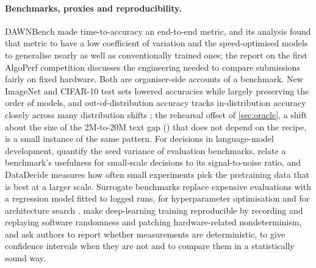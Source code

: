 \paragraph{Benchmarks, proxies and reproducibility.} DAWNBench \citep{coleman2017dawnbench} made time-to-accuracy an
end-to-end metric, and its analysis \citep{coleman2019dawnbench} found that metric to have a low coefficient of
variation and the speed-optimised models to generalise nearly as well as conventionally trained ones; the report on
the first AlgoPerf competition \citep{kasimbeg2025algoperf} discusses the engineering needed to compare submissions
fairly on fixed hardware. Both are organiser-side accounts of a benchmark. New ImageNet and CIFAR-10 test sets
\citep{recht2019imagenet} lowered accuracies while largely preserving the order of models, and out-of-distribution
accuracy tracks in-distribution accuracy closely across many distribution shifts \citep{miller2021accuracy}; the
rehearsal offset of \cref{sec:oracle}, a shift about the size of the 2M-to-20M text gap () that does
not depend on the recipe, is a small instance of the same pattern. For decisions in language-model development,
\citet{madaan2024variance} quantify the seed variance of evaluation benchmarks, \citet{heineman2025signal} relate a
benchmark's usefulness for small-scale decisions to its signal-to-noise ratio, and DataDecide
\citep{magnusson2025datadecide} measures how often small experiments pick the pretraining data that is best at a
larger scale. Surrogate benchmarks replace expensive evaluations with a regression model fitted to logged runs, for
hyperparameter optimisation \citep{eggensperger2015surrogates} and for architecture search
\citep{zela2022surrogate}. \citet{chen2022reproducible} make deep-learning training reproducible by recording and
replaying software randomness and patching hardware-related nondeterminism, and \citet{hoefler2015scientific} ask
authors to report whether measurements are deterministic, to give confidence intervals when they are not and to
compare them in a statistically sound way.

